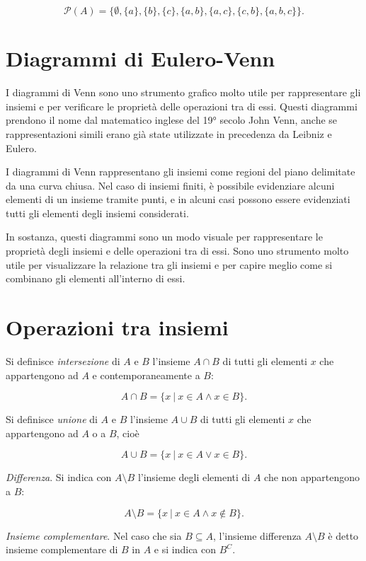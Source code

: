 \documentclass[
  italian,
  letterpaper,
  a4paper,
  11pt,
  open=any]{scrbook}
\theoremstyle{plain}
\theoremstyle{definition}
\theoremstyle{definition}
\theoremstyle{remark}
\begin{document}
\[
\mathcal{P}(A) = \{
\emptyset, \{a\}, \{b\}, \{c\},
 \{a, b\}, \{a, c\}, \{c, b\},
 \{a, b, c\}
\}.
\]

\section{Diagrammi di Eulero-Venn}\label{diagrammi-di-eulero-venn}

I diagrammi di Venn sono uno strumento grafico molto utile per
rappresentare gli insiemi e per verificare le proprietà delle operazioni
tra di essi. Questi diagrammi prendono il nome dal matematico inglese
del 19° secolo John Venn, anche se rappresentazioni simili erano già
state utilizzate in precedenza da Leibniz e Eulero.

I diagrammi di Venn rappresentano gli insiemi come regioni del piano
delimitate da una curva chiusa. Nel caso di insiemi finiti, è possibile
evidenziare alcuni elementi di un insieme tramite punti, e in alcuni
casi possono essere evidenziati tutti gli elementi degli insiemi
considerati.

In sostanza, questi diagrammi sono un modo visuale per rappresentare le
proprietà degli insiemi e delle operazioni tra di essi. Sono uno
strumento molto utile per visualizzare la relazione tra gli insiemi e
per capire meglio come si combinano gli elementi all'interno di essi.

\section{Operazioni tra insiemi}\label{operazioni-tra-insiemi}

Si definisce \emph{intersezione} di \(A\) e \(B\) l'insieme \(A \cap B\)
di tutti gli elementi \(x\) che appartengono ad \(A\) e
contemporaneamente a \(B\):

\[
A \cap B = \{x ~\vert~ x \in A \land x \in B\}.
\]

Si definisce \emph{unione} di \(A\) e \(B\) l'insieme \(A \cup B\) di
tutti gli elementi \(x\) che appartengono ad \(A\) o a \(B\), cioè

\[
A \cup B = \{x ~\vert~ x \in A \lor x \in B\}.
\]

\emph{Differenza}. Si indica con \(A \setminus B\) l'insieme degli
elementi di \(A\) che non appartengono a \(B\):

\[
A \setminus B = \{x ~\vert~ x \in A \land x \notin B\}.
\]

\emph{Insieme complementare}. Nel caso che sia \(B \subseteq A\),
l'insieme differenza \(A \setminus B\) è detto insieme complementare di
\(B\) in \(A\) e si indica con \(B^C\).
\end{document}
